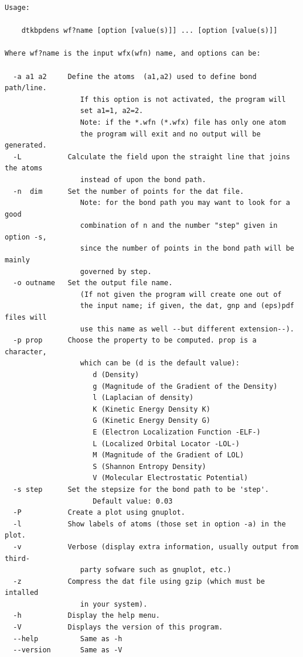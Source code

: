 \begin{footnotesize}
\begin{verbatim}
Usage:

	dtkbpdens wf?name [option [value(s)]] ... [option [value(s)]]

Where wf?name is the input wfx(wfn) name, and options can be:

  -a a1 a2     Define the atoms  (a1,a2) used to define bond path/line.
                  If this option is not activated, the program will 
                  set a1=1, a2=2.
                  Note: if the *.wfn (*.wfx) file has only one atom
                  the program will exit and no output will be generated.
  -L           Calculate the field upon the straight line that joins the atoms
                  instead of upon the bond path.
  -n  dim      Set the number of points for the dat file.
                  Note: for the bond path you may want to look for a good 
                  combination of n and the number "step" given in option -s,
                  since the number of points in the bond path will be mainly 
                  governed by step.
  -o outname   Set the output file name.
                  (If not given the program will create one out of
                  the input name; if given, the dat, gnp and (eps)pdf files will
                  use this name as well --but different extension--).
  -p prop      Choose the property to be computed. prop is a character,
                  which can be (d is the default value): 
                     d (Density)
                     g (Magnitude of the Gradient of the Density)
                     l (Laplacian of density)
                     K (Kinetic Energy Density K)
                     G (Kinetic Energy Density G)
                     E (Electron Localization Function -ELF-)
                     L (Localized Orbital Locator -LOL-)
                     M (Magnitude of the Gradient of LOL)
                     S (Shannon Entropy Density)
                     V (Molecular Electrostatic Potential)
  -s step      Set the stepsize for the bond path to be 'step'.
                     Default value: 0.03
  -P           Create a plot using gnuplot.
  -l           Show labels of atoms (those set in option -a) in the plot.
  -v           Verbose (display extra information, usually output from third-
                  party sofware such as gnuplot, etc.)
  -z           Compress the dat file using gzip (which must be intalled
                  in your system).
  -h           Display the help menu.
  -V           Displays the version of this program.
  --help          Same as -h
  --version       Same as -V


\end{verbatim}
\end{footnotesize}

